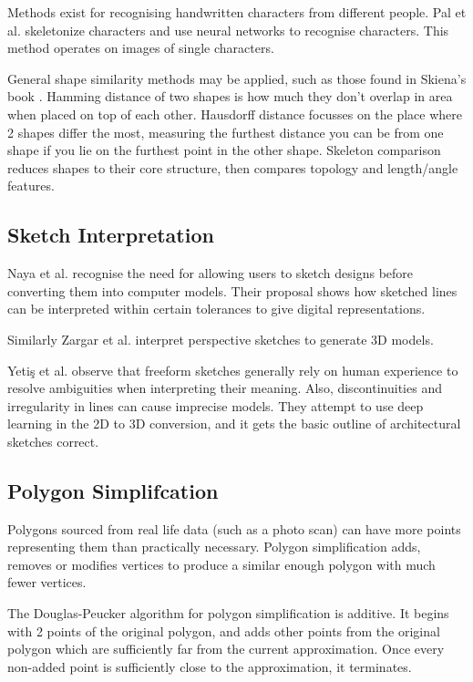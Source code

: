 \documentclass[11pt]{IEEEtran}
\begin{document}
Methods exist for recognising handwritten characters from different people. Pal et al. \cite{pal2010handwritten} skeletonize characters and use neural networks to recognise characters. This method operates on images of single characters.

General shape similarity methods may be applied, such as those found in Skiena's book \cite{skiena2020algorithm}. Hamming distance of two shapes is how much they don't overlap in area when placed on top of each other. Hausdorff distance focusses on the place where 2 shapes differ the most, measuring the furthest distance you can be from one shape if you lie on the furthest point in the other shape. Skeleton comparison reduces shapes to their core structure, then compares topology and length/angle features.

\subsection{Sketch Interpretation}

Naya et al. \cite{naya2002direct} recognise the need for allowing users to sketch designs before converting them into computer models. Their proposal shows how sketched lines can be interpreted within certain tolerances to give digital representations. 

Similarly Zargar et al. \cite{zargar2019introducing} interpret perspective sketches to generate 3D models.

Yetiş et al. \cite{yetics2019auto} observe that freeform sketches generally rely on human experience to resolve ambiguities when interpreting their meaning. Also, discontinuities and irregularity in lines can cause imprecise models. They attempt to use deep learning in the 2D to 3D conversion, and it gets the basic outline of architectural sketches correct.

\subsection{Polygon Simplifcation}

Polygons sourced from real life data (such as a photo scan) can have more points representing them than practically necessary. Polygon simplification adds, removes or modifies vertices to produce a similar enough polygon with much fewer vertices.

The Douglas-Peucker algorithm \cite{douglas1973algorithms} for polygon simplification is additive. It begins with 2 points of the original polygon, and adds other points from the original polygon which are sufficiently far from the current approximation. Once every non-added point is sufficiently close to the approximation, it terminates.
\end{document}
